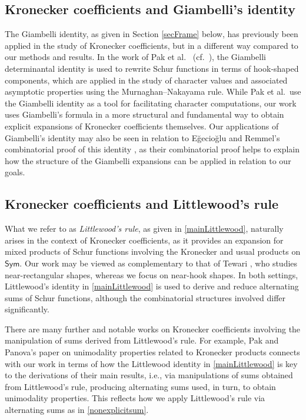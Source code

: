 \documentclass[12pt]{article}
\begin{document}
\subsection{Kronecker coefficients and Giambelli's identity}
 The Giambelli identity, as given in Section \ref{secFrame} below, has previously been applied in the study of Kronecker coefficients, but in 
 a different way compared to our methods and results. In the work of Pak et al.\ \cite{PakPanovaVallejo2016} (cf.\ \cite{PakPanova2017}), 
 the Giambelli determinantal identity is used to rewrite Schur functions in terms of hook-shaped components, which are applied in the 
 study of character values and associated asymptotic properties using the Murnaghan--Nakayama rule. While Pak et al.\ use the 
 Giambelli identity as a tool for facilitating character computations, our work uses Giambelli’s formula in a more structural and 
 fundamental way to obtain explicit expansions of Kronecker coefficients themselves. Our applications of Giambelli's identity may also be 
 seen in relation to E\u gecio\u glu and Remmel's combinatorial proof of this identity \cite{EgeciogluRemmel1988}, as their 
 combinatorial proof helps to explain how the structure of the Giambelli expansions can be applied in relation to our goals. 

\subsection{Kronecker coefficients and Littlewood's rule}
 What we refer to as \emph{Littlewood's rule}, as given in \eqref{mainLittlewood}, naturally arises in the context of Kronecker coefficients, 
 as it provides an expansion for mixed products of Schur functions involving the Kronecker and usual products on $\textsf{Sym}$. Our 
 work may be viewed as complementary to that of Tewari \cite{Tewari2015}, who studies near-rectangular shapes, whereas we focus on 
 near-hook shapes. In both settings, Littlewood’s identity in \eqref{mainLittlewood} is used to derive and reduce alternating sums of 
 Schur functions, although the combinatorial structures involved differ significantly.

 There are many further and notable works on Kronecker coefficients involving the manipulation of sums derived from Littlewood's rule. 
 For example, Pak and Panova's paper \cite{PakPanova2014} on unimodality properties related to Kronecker products connects with our 
 work in terms of how the Littlewood identity in \eqref{mainLittlewood} is key to the derivations of their main results, i.e., via 
 manipulations of sums obtained from Littlewood's rule, producing alternating sums used, in turn, to obtain unimodality properties. 
 This reflects how we apply Littlewood's rule via alternating sums as in \eqref{nonexplicitsum}. 
\end{document}
